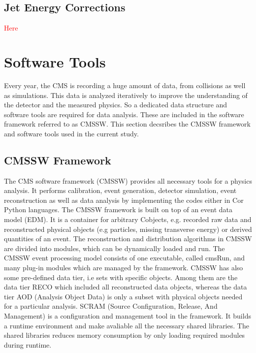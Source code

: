\subsection{Jet Energy Corrections}
\textcolor{red}{\Large Here}

\section{Software Tools}
Every year, the CMS is recording a huge amount of data, from collisions as well as simulations. This data is analyzed iteratively to improve the understanding of the detector and the measured physics. So a dedicated data structure and software tools are required for data analysis. These are included in the software framework referred to as CMSSW. This section decsribes the CMSSW framework and software tools used in the current study.

\subsection{CMSSW Framework}
The CMS software framework (CMSSW) \cite{CMS:2005aa} provides all necessary tools for a physics analysis. It performs calibration, event generation, detector simulation, event reconstruction as well as data analysis by implementing the codes either in C\plusn\plus or Python languages. The CMSSW framework is built on top of an event data model (EDM). It is a container for arbitrary C\plusn\plus objects, e.g. recorded raw data and reconstructed physical objects (e.g particles, missing transverse energy) or derived quantities of an event. The reconstruction and distribution algorithms in CMSSW are divided into modules, which can be dynamically loaded and run. The CMSSW event processing model consists of one executable, called cmsRun, and many plug-in modules which are managed by the framework. CMSSW has also some pre-defined data tier, i.e sets with specific objects. Among them are the data tier RECO which included all reconstructed data objects, whereas the data tier AOD (Analysis Object Data) is only a subset with physical objects needed for a particular analysis. SCRAM (Source Configuration, Release, And Management) is a configuration and management tool in the framework. It builds a runtime environment and make avaliable all the necessary shared libraries. The shared libraries reduces memory consumption by only loading required modules during runtime. 

